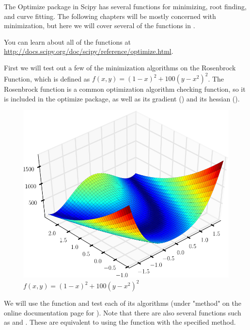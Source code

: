 \label{lab:Optimization1}

The Optimize package in Scipy has several functions for minimizing, root finding, and curve fitting. The following chapters will be mostly concerned with minimization, but here we will cover several of the functions in .

You can learn about all of the functions at \url{http://docs.scipy.org/doc/scipy/reference/optimize.html}.

First we will test out a few of the minimization algorithms on the Rosenbrock Function, which is defined as $f(x,y) = (1-x)^2 + 100(y-x^2)^2$.
The Rosenbrock function is a common optimization algorithm checking function, so it is included in the optimize package, as well as its gradient () and its hessian ().

\begin{figure}
\includegraphics[width=\textwidth]{Rosenbrock.pdf}
\caption{$f(x,y) = (1-x)^2 + 100(y-x^2)^2$}
\label{opt:rosenbrock}
\end{figure}

We will use the  function and test each of its algorithms (under "method" on the online documentation page for ). Note that there are also several functions such as  and . These are equivalent to using the  function with the specified method.

